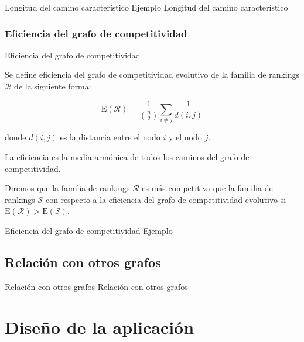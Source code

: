 \documentclass[11pt]{beamer}
\begin{document}
	\begin{frame}{Longitud del camino característico}
	Ejemplo	Longitud del camino característico
	\end{frame}
	
	\subsubsection{Eficiencia del grafo de competitividad}
	
	\begin{frame}{Eficiencia del grafo de competitividad}
		\begin{defi}
			Se define eficiencia del grafo de competitividad evolutivo de la familia de rankings $\mathcal{R}$ de la siguiente forma:
			
			\begin{equation}
			\mathrm{E}(\mathcal{R}) = \dfrac{1}{\binom{n}{2}} \sum_{i\neq j} \dfrac{1}{d(i,j)}
			\end{equation}
			
			donde $d(i,j)$ es la distancia entre el nodo $i$ y el nodo $j$.
		\end{defi}
		
		La eficiencia es la media armónica de todos los caminos del grafo de competitividad.
		
		\begin{defi}
			Diremos que la familia de rankings $\mathcal{R}$ es más competitiva que la familia de rankings $\mathcal{S}$ con respecto a la eficiencia del grafo de competitividad evolutivo si $\mathrm{E}(\mathcal{R}) > \mathrm{E}(\mathcal{S})$.
		\end{defi}
	\end{frame}
	
	\begin{frame}{Eficiencia del grafo de competitividad}
		Ejemplo
	\end{frame}
	
	\subsection{Relación con otros grafos}
	
	\begin{frame}{Relación con otros grafos}
		Relación con otros grafos
	\end{frame}
	
	\section{Diseño de la aplicación}
	
\end{document}
